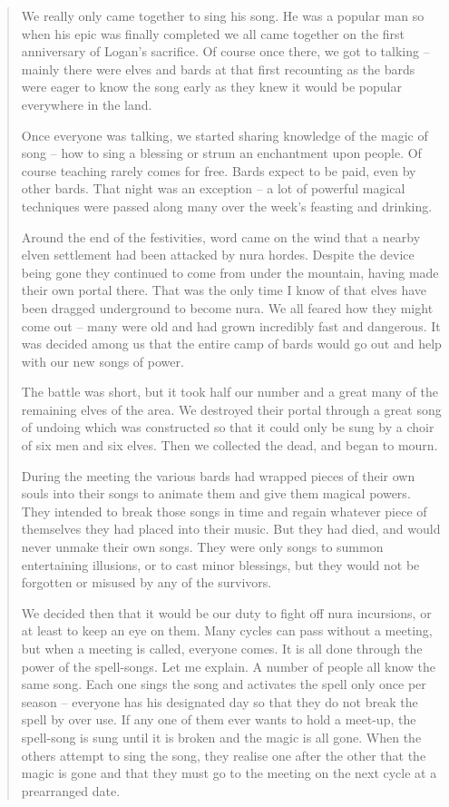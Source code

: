 \begin{quotation}
We really only came together to sing his song.  He was a popular man so when his epic was finally completed we all came together on the first anniversary of Logan's sacrifice.  Of course once there, we got to talking -- mainly there were elves and bards at that first recounting as the bards were eager to know the song early as they knew it would be popular everywhere in the land.

	Once everyone was talking, we started sharing knowledge of the magic of song -- how to sing a blessing or strum an enchantment upon people.  Of course teaching rarely comes for free.  Bards expect to be paid, even by other bards.  That night was an exception -- a lot of powerful magical techniques were passed along many over the week's feasting and drinking.

	Around the end of the festivities, word came on the wind that a nearby elven settlement had been attacked by nura hordes.  Despite the device being gone they continued to come from under the mountain, having made their own portal there.  That was the only time I know of that elves have been dragged underground to become nura.  We all feared how they might come out -- many were old and had grown incredibly fast and dangerous.  It was decided among us that the entire camp of bards would go out and help with our new songs of power.

	The battle was short, but it took half our number and a great many of the remaining elves of the area.  We destroyed their portal through a great song of undoing which was constructed so that it could only be sung by a choir of six men and six elves.  Then we collected the dead, and began to mourn.

	During the meeting the various bards had wrapped pieces of their own souls into their songs to animate them and give them magical powers.  They intended to break those songs in time and regain whatever piece of themselves they had placed into their music.  But they had died, and would never unmake their own songs.  They were only songs to summon entertaining illusions, or to cast minor blessings, but they would not be forgotten or misused by any of the survivors.

	We decided then that it would be our duty to fight off nura incursions, or at least to keep an eye on them.  Many cycles can pass without a meeting, but when a meeting is called, everyone comes.  It is all done through the power of the spell-songs.  Let me explain.  A number of people all know the same song.  Each one sings the song and activates the spell only once per season -- everyone has his designated day so that they do not break the spell by over use.  If any one of them ever wants to hold a meet-up, the spell-song is sung until it is broken and the magic is all gone.  When the others attempt to sing the song, they realise one after the other that the magic is gone and that they must go to the meeting on the next cycle at a prearranged date.


\end{quotation}
